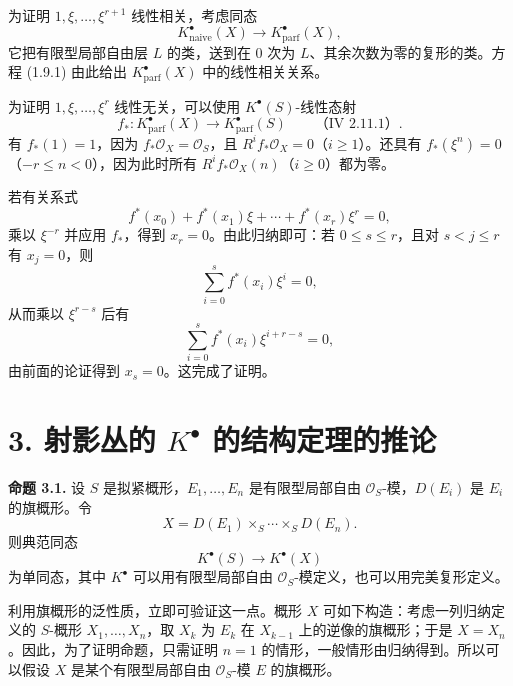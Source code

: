 为证明 \(1,\xi,\ldots,\xi^{r+1}\) 线性相关，考虑同态
\[
 K^\bullet_{\mathrm{naive}}(X)\longrightarrow K^\bullet_{\mathrm{parf}}(X),
\]
它把有限型局部自由层 \(L\) 的类，送到在 \(0\) 次为 \(L\)、其余次数为零的复形的类。方程 (1.9.1) 由此给出 \(K^\bullet_{\mathrm{parf}}(X)\) 中的线性相关关系。

为证明 \(1,\xi,\ldots,\xi^r\) 线性无关，可以使用 \(K^\bullet(S)\)-线性态射
\[
 f_*:K^\bullet_{\mathrm{parf}}(X)\longrightarrow K^\bullet_{\mathrm{parf}}(S)\qquad\text{（IV 2.11.1）}.
\]
有 \(f_*(1)=1\)，因为 \(f_*\mathcal O_X=\mathcal O_S\)，且 \(R^if_*\mathcal O_X=0\)（\(i\geq1\)）。还具有 \(f_*(\xi^n)=0\)（\(-r\leq n<0\)），因为此时所有 \(R^if_*\mathcal O_X(n)\)（\(i\geq0\)）都为零。

若有关系式
\[
 f^*(x_0)+f^*(x_1)\xi+\cdots+f^*(x_r)\xi^r=0,
\]
乘以 \(\xi^{-r}\) 并应用 \(f_*\)，得到 \(x_r=0\)。由此归纳即可：若 \(0\leq s\leq r\)，且对 \(s<j\leq r\) 有 \(x_j=0\)，则
\[
 \sum_{i=0}^s f^*(x_i)\xi^i=0,
\]
从而乘以 \(\xi^{r-s}\) 后有
\[
 \sum_{i=0}^s f^*(x_i)\xi^{i+r-s}=0,
\]
由前面的论证得到 \(x_s=0\)。这完成了证明。

\providecommand{\Sym}{\operatorname{Sym}}
\providecommand{\GL}{\operatorname{GL}}
\providecommand{\Grass}{\operatorname{Grass}}
\providecommand{\gr}{\operatorname{gr}}
\providecommand{\ctop}{c_{\mathrm{top}}}
\providecommand{\Rep}{\operatorname{Rep}}
\providecommand{\RZ}{R_{\mathbb Z}}
\providecommand{\Dflag}{D}
\providecommand{\Gmn}{G}


\section*{3. 射影丛的 \(K^\bullet\) 的结构定理的推论}

\textbf{命题 3.1.} 设 \(S\) 是拟紧概形，\(E_1,\ldots,E_n\) 是有限型局部自由 \(\mathcal O_S\)-模，\(D(E_i)\) 是 \(E_i\) 的旗概形。令
\[
  X=D(E_1)\times_S\cdots\times_S D(E_n).
\]
则典范同态
\[
  K^\bullet(S)\longrightarrow K^\bullet(X)
\]
为单同态，其中 \(K^\bullet\) 可以用有限型局部自由 \(\mathcal O_S\)-模定义，也可以用完美复形定义。

利用旗概形的泛性质，立即可验证这一点。概形 \(X\) 可如下构造：考虑一列归纳定义的 \(S\)-概形 \(X_1,\ldots,X_n\)，取 \(X_k\) 为 \(E_k\) 在 \(X_{k-1}\) 上的逆像的旗概形；于是 \(X=X_n\)。因此，为了证明命题，只需证明 \(n=1\) 的情形，一般情形由归纳得到。所以可以假设 \(X\) 是某个有限型局部自由 \(\mathcal O_S\)-模 \(E\) 的旗概形。


